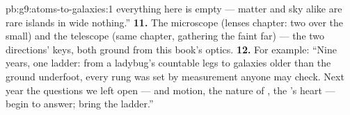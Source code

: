 \begin{solution}{pb:g9:atoms-to-galaxies:1}
everything here is empty --- matter and sky alike are rare
islands in wide nothing.''
\textbf{11.} The microscope (lenses chapter: two  over the small) and the telescope (same chapter,
gathering the faint far) --- the two directions' keys, both
ground from this book's optics.
\textbf{12.} For example: ``Nine years, one ladder: from a
ladybug's countable legs to galaxies older than the ground
underfoot, every rung was set by measurement anyone may
check. Next year the questions we left open ---  and
motion, the nature of , the 's heart --- begin to
answer; bring the ladder.''
\end{solution}
